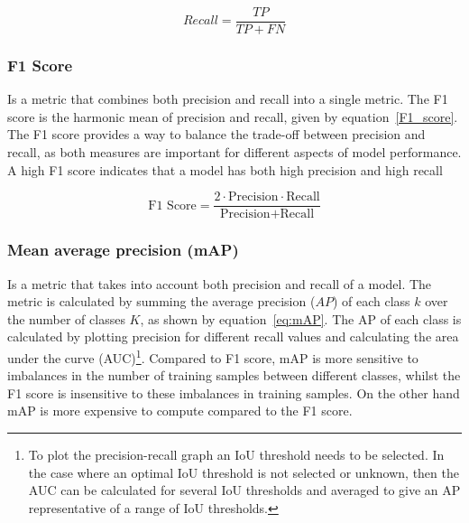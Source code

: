 \begin{equation}
  Recall =   \frac{TP}{TP+FN}
  \label{eq:recall}
\end{equation}

\subsubsection{F1 Score} Is a metric that combines both precision and recall into a single metric. The F1 score is the harmonic mean of precision and recall, given by equation~\ref{F1_score}.
%
The F1 score provides a way to balance the trade-off between precision and recall, as both measures are important for different aspects of model performance. A high F1 score indicates that a model has both high precision and high recall%

\begin{equation}
  \text{F1 Score} =   \frac{2 \cdot \text{Precision} \cdot \text{Recall}}{\text{Precision} + \text{Recall}}
  \label{F1_score}
\end{equation}

\subsubsection{Mean average precision (mAP)} Is a metric that takes into account both precision and recall of a model. 
%
The metric is calculated by summing the average precision ($AP$) of each class $k$ over the number of classes $K$, as shown by equation~\ref{eq:mAP}.  
%
The AP of each class is calculated by plotting precision for different recall values and calculating the area under the curve (AUC)\footnote{To plot the precision-recall graph an IoU threshold needs to be selected. In the case where an optimal IoU threshold is not selected or unknown, then the AUC can be calculated for several IoU thresholds and averaged to give an AP representative of a range of IoU thresholds.}.
%
Compared to F1 score, mAP is more sensitive to imbalances in the number of training samples between different classes, whilst the F1 score is insensitive to these imbalances in training samples. On the other hand mAP is more expensive to compute compared to the F1 score.
%

